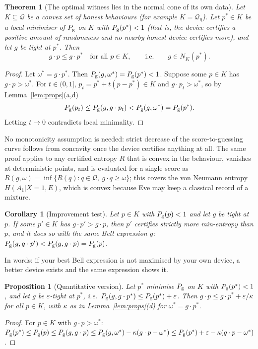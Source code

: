 \documentclass[11pt]{article}
\newtheorem{theorem}{Theorem}
\newtheorem{proposition}{Proposition}
\newtheorem{corollary}{Corollary}
\theoremstyle{definition}\newtheorem{definition}{Definition}
\theoremstyle{remark}\newtheorem{remark}{Remark}
\newcommand{\Q}{\mathcal Q}
\newcommand{\Pg}{P_{\rm g}}
\begin{document}
\begin{theorem}[The optimal witness lies in the normal cone of its own data]\label{thm:own}
Let $K\subseteq\Q$ be a convex set of honest behaviours (for example $K=\Q_\eta$). Let $p^*\in K$ be a local minimiser of $\Pg$ on $K$ with $\Pg(p^*)<1$ (that is, the device certifies a positive amount of randomness and no nearby honest device certifies more), and let $g$ be tight at $p^*$. Then
\[
g\cdot p\le g\cdot p^*\quad\text{for all }p\in K,\qquad\text{i.e.}\qquad g\in N_K(p^*).
\]
\end{theorem}
\begin{proof}
Let $\omega^*=g\cdot p^*$. Then $\Pg(g,\omega^*)=\Pg(p^*)<1$. Suppose some $p\in K$ has $g\cdot p>\omega^*$. For $t\in(0,1]$, $p_t=p^*+t(p-p^*)\in K$ and $g\cdot p_t>\omega^*$, so by Lemma~\ref{lem:props}(a,d)
\[
\Pg(p_t)\le\Pg(g,g\cdot p_t)<\Pg(g,\omega^*)=\Pg(p^*).
\]
Letting $t\to0$ contradicts local minimality.
\end{proof}
\noindent No monotonicity assumption is needed: strict decrease of the score-to-guessing curve follows from concavity once the device certifies anything at all. The same proof applies to any certified entropy $R$ that is convex in the behaviour, vanishes at deterministic points, and is evaluated for a single score as $R(g,\omega)=\inf\{R(q):q\in\Q,\ g\cdot q\ge\omega\}$; this covers the von Neumann entropy $H(A_1|X{=}1,E)$, which is convex because Eve may keep a classical record of a mixture.

\begin{corollary}[Improvement test]\label{cor:improve}
Let $p\in K$ with $\Pg(p)<1$ and let $g$ be tight at $p$. If some $p'\in K$ has $g\cdot p'>g\cdot p$, then $p'$ certifies strictly more min-entropy than $p$, and it does so with the same Bell expression $g$: $\Pg(g,g\cdot p')<\Pg(g,g\cdot p)=\Pg(p)$.
\end{corollary}
\noindent In words: if your best Bell expression is not maximised by your own device, a better device exists and the same expression shows it.

\begin{proposition}[Quantitative version]\label{prop:quant}
Let $p^*$ minimise $\Pg$ on $K$ with $\Pg(p^*)<1$, and let $g$ be $\varepsilon$-tight at $p^*$, i.e.\ $\Pg(g,g\cdot p^*)\le\Pg(p^*)+\varepsilon$. Then $g\cdot p\le g\cdot p^*+\varepsilon/\kappa$ for all $p\in K$, with $\kappa$ as in Lemma~\ref{lem:props}(d) for $\omega^*=g\cdot p^*$.
\end{proposition}
\begin{proof}
For $p\in K$ with $g\cdot p>\omega^*$: $\Pg(p^*)\le\Pg(p)\le\Pg(g,g\cdot p)\le\Pg(g,\omega^*)-\kappa(g\cdot p-\omega^*)\le\Pg(p^*)+\varepsilon-\kappa(g\cdot p-\omega^*)$.
\end{proof}
\end{document}
